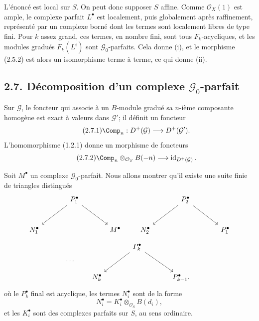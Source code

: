 \documentclass[11pt]{article}
\begin{document}
L'énoncé est local sur \(S\). On peut donc supposer \(S\) affine. Comme \(\mathcal O_X(1)\) est ample, le complexe parfait \(L^\bullet\) est localement, puis globalement après raffinement, représenté par un complexe borné dont les termes sont localement libres de type fini. Pour \(k\) assez grand, ces termes, en nombre fini, sont tous \(F_k\)-acycliques, et les modules gradués \(F_k(L^i)\) sont \(\mathcal G_0\)-parfaits. Cela donne (i), et le morphisme (2.5.2) est alors un isomorphisme terme à terme, ce qui donne (ii).

\subsection*{2.7. Décomposition d'un complexe \(\mathcal G_0\)-parfait}
Sur \(\mathcal G\), le foncteur qui associe à un \(B\)-module gradué sa \(n\)-ième composante homogène est exact à valeurs dans \(\mathcal G'\); il définit un foncteur
\begin{equation}\tag{2.7.1}
  \Comp_n:D^+(\mathcal G)\longrightarrow D^+(\mathcal G').
\end{equation}
L'homomorphisme (1.2.1) donne un morphisme de foncteurs
\begin{equation}\tag{2.7.2}
  \Comp_n\otimes_{\mathcal O_S}B(-n)\longrightarrow
  \operatorname{id}_{D^+(\mathcal G)}.
\end{equation}

Soit \(M^\bullet\) un complexe \(\mathcal G_0\)-parfait. Nous allons montrer qu'il existe une suite finie de triangles distingués
\[
\begin{tikzcd}[column sep=large,row sep=large]
& P_1^\bullet \arrow[dl] \arrow[dr] &\\
N_1^\bullet && M^\bullet
\end{tikzcd}
\qquad
\begin{tikzcd}[column sep=large,row sep=large]
& P_2^\bullet \arrow[dl] \arrow[dr] &\\
N_2^\bullet && P_1^\bullet
\end{tikzcd}
\]
\[
\cdots\qquad
\begin{tikzcd}[column sep=large,row sep=large]
& P_k^\bullet \arrow[dl] \arrow[dr] &\\
N_k^\bullet && P_{k-1}^\bullet .
\end{tikzcd}
\]
où le \(P_k^\bullet\) final est acyclique, les termes \(N_i^\bullet\) sont de la forme
\[
  N_i^\bullet=K_i^\bullet\otimes_{\mathcal O_S}B(d_i),
\]
et les \(K_i^\bullet\) sont des complexes parfaits sur \(S\), au sens ordinaire.
\end{document}
